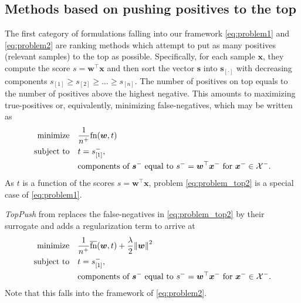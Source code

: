 \documentclass{Thesis}
\newcommand{\Brac}[2][r]{%
  \ifx r#1 \left(       #2 \right)       \else
  \ifx c#1 \left\{      #2 \right\}      \else
  \ifx s#1 \left[       #2 \right]       \else
  \ifx v#1 \left\vert   #2 \right\vert   \else
  \ifx a#1 \left\langle #2 \right\rangle \else
  \ifx t#1 \left\lceil  #2 \right\rceil  \else
  \ifx b#1 \left\lfloor #2 \right\rfloor \else
  \ifx n#1 \left\|      #2 \right\|      \else
  \mathrm{Illegal~option}%
  \fi\fi\fi\fi\fi\fi\fi\fi
}
\newcommand{\Xc}{\mathcal{X}}
\newcommand{\norm}[1]{\Brac[n]{#1}}
\newcommand{\minimize}{\operatorname*{minimize}}
\newcommand{\st}{\operatorname{subject\ to}}
\newcommand{\TopPush}{\emph{TopPush}\xspace}
\newcommand{\fn}{\textnormal{fn}}
\newcommand{\fns}{\overline{\textnormal{fn}}}
\begin{document}
\subsection{Methods based on pushing positives to the top}\label{sec:obj1}

The first category of formulations falling into our framework \eqref{eq:problem1} and \eqref{eq:problem2} are ranking methods which attempt to put as many positives (relevant samples) to the top as possible. Specifically, for each sample $\bm{x}$, they compute the score $s = \bm{w}^\top \bm{x}$ and then sort the vector $\bm{s}$ into $\bm{s}_{[\cdot]}$ with decreasing components $s_{[1]} \ge s_{[2]} \ge \dots \ge s_{[n]}$. The number of positives on top equals to the number of positives above the highest negative. This amounts to maximizing true-positives or, equivalently, minimizing false-negatives, which may be written as
\begin{equation}\label{eq:problem_top2}
  \begin{aligned}
    \minimize
    & \quad\frac{1}{n^{+}}\fn(\bm{w},t) \\
    \st
    & \quad t = s_{[1]}^-, \\
    & \quad \text{components of }\bm{s}^- \text{ equal to } s^- = \bm{w}^\top \bm{x}^-\text{ for }\bm{x}^- \in \Xc^-.
  \end{aligned}
\end{equation}
As $t$ is a function of the scores $s = \bm{w}^\top \bm{x}$, problem \eqref{eq:problem_top2} is a special case of \eqref{eq:problem1}.


\TopPush from \cite{Li_TopPush} replaces the false-negatives in \eqref{eq:problem_top2} by their surrogate and adds a regularization term to arrive at
\begin{equation}\label{eq:problem_toppush}
  \begin{aligned}
    \minimize
    & \quad \frac{1}{n^{+}} \fns(\bm{w}, t) + \frac{\lambda}{2} \norm{\bm{w}}^2 \\
    \st
    & \quad t = s_{[1]}^-, \\
    & \quad \text{components of }\bm{s}^-\text{ equal to } s^- = \bm{w}^\top \bm{x}^- \text{ for }\bm{x}^- \in \Xc^-.
  \end{aligned}
\end{equation}
Note that this falls into the framework of \eqref{eq:problem2}.
\end{document}

